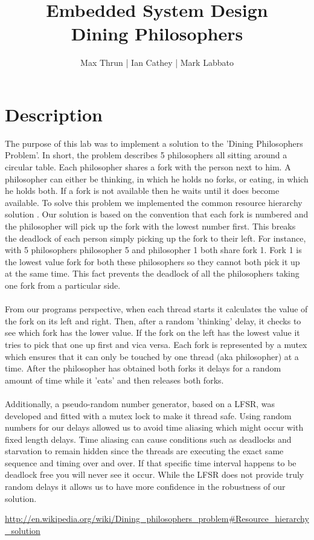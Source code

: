 \documentclass[12pt]{article}
\title{Embedded System Design \\ Dining Philosophers}
\author{ Max Thrun | Ian Cathey | Mark Labbato }
\begin{document}
\maketitle

\section*{Description}

The purpose of this lab was to implement a solution to the
'Dining Philosophers Problem'. In short, the problem describes
5 philosophers all sitting around a circular table. Each philosopher
shares a fork with the person next to him. A philosopher can either
be thinking, in which he holds no forks, or eating, in which he holds
both. If a fork is not available then he waits until it
does become available. To solve this problem we implemented the common
resource hierarchy solution \cite{sol}. Our solution is based on the
convention that each fork is numbered and the philosopher will pick up
the fork with the lowest number first. This breaks the deadlock of each
person simply picking up the fork to their left. For instance, with 5
philosophers philosopher 5 and philosopher 1 both share fork 1. Fork 1
is the lowest value fork for both these philosophers so they cannot both
pick it up at the same time. This fact prevents the deadlock of all the
philosophers taking one fork from a particular side.
\\\\
From our programs perspective, when each thread starts it calculates the
value of the fork on its left and right. Then, after a random 'thinking'
delay, it checks to see which fork has the lower value. If the fork on the
left has the lowest value it tries to pick that one up first and vica versa.
Each fork is represented by a mutex which ensures that it can only be touched
by one thread (aka philosopher) at a time. After the philosopher has obtained both
forks it delays for a random amount of time while it 'eats' and then releases
both forks.
\\\\
Additionally, a pseudo-random number generator, based on a LFSR, was developed
and fitted with a mutex lock to make it thread safe. Using random numbers for our delays 
allowed us to avoid time aliasing which might occur with fixed length delays. Time aliasing 
can cause conditions such as deadlocks and starvation to remain hidden since the threads are
executing the exact same sequence and timing over and over. If that specific time interval
happens to be deadlock free you will never see it occur.  While the LFSR does not provide 
truly random delays it allows us to have more confidence in the robustness of our solution.

\begin{thebibliography}{9}
     \url{http://en.wikipedia.org/wiki/Dining_philosophers_problem#Resource_hierarchy_solution}
\end{thebibliography}
\end{document}
